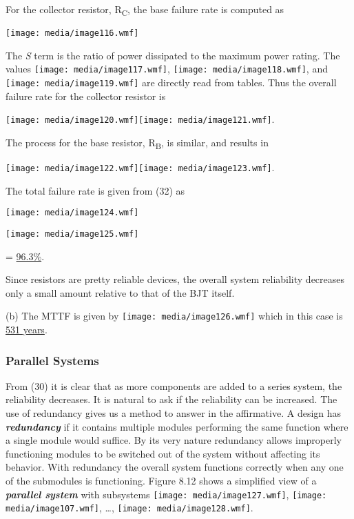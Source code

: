 For the collector resistor, R\textsubscript{C}, the base failure rate is
computed as

\texttt{[image: media/image116.wmf]}

The \emph{S} term is the ratio of power dissipated to the maximum power
rating. The values \texttt{[image: media/image117.wmf]},
\texttt{[image: media/image118.wmf]}, and
\texttt{[image: media/image119.wmf]} are directly read from tables. Thus
the overall failure rate for the collector resistor is

\texttt{[image: media/image120.wmf]}\texttt{[image: media/image121.wmf]}.

The process for the base resistor, R\textsubscript{B}, is similar, and
results in

\texttt{[image: media/image122.wmf]}\texttt{[image: media/image123.wmf]}.

The total failure rate is given from (32) as

\texttt{[image: media/image124.wmf]}

\texttt{[image: media/image125.wmf]}

= \ul{96.3\%}.

Since resistors are pretty reliable devices, the overall system
reliability decreases only a small amount relative to that of the BJT
itself.

(b) The MTTF is given by \texttt{[image: media/image126.wmf]} which in
this case is \ul{531 years}.

\subsubsection{Parallel Systems}\label{parallel-systems}

From (30) it is clear that as more components are added to a series
system, the reliability decreases. It is natural to ask if the
reliability can be increased. The use of redundancy gives us a method to
answer in the affirmative. A design has \emph{\textbf{redundancy}} if it
contains multiple modules performing the same function where a single
module would suffice. By its very nature redundancy allows improperly
functioning modules to be switched out of the system without affecting
its behavior. With redundancy the overall system functions correctly
when any one of the submodules is functioning. Figure 8.12 shows a
simplified view of a \emph{\textbf{parallel system}} with subsystems
\texttt{[image: media/image127.wmf]},
\texttt{[image: media/image107.wmf]}, \ldots,
\texttt{[image: media/image128.wmf]}.

